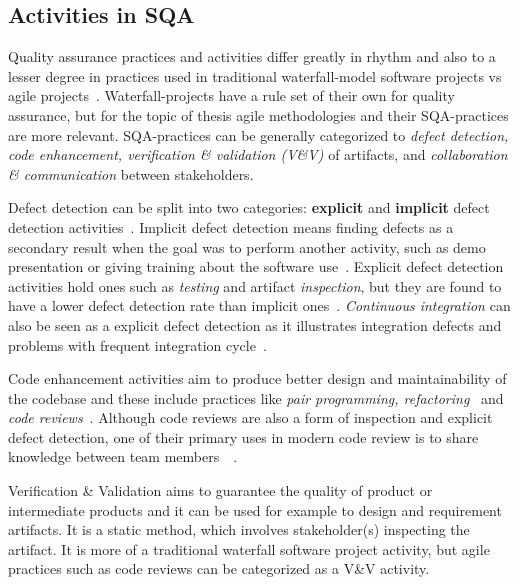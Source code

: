     \subsection{Activities in SQA}
    Quality assurance practices and activities differ greatly in rhythm and also to a lesser degree in practices used in
    traditional waterfall-model software projects vs agile projects~\cite{huo2004software}. Waterfall-projects have a rule set
    of their own for quality assurance, but for the topic of thesis agile methodologies and their SQA-practices are more relevant.
    SQA-practices can be generally categorized to \textit{defect detection, code enhancement, verification \& validation (V\&V)} of artifacts,
    and \textit{collaboration \& communication} between stakeholders.

    Defect detection can be split into two categories: \textbf{explicit} and \textbf{implicit} defect detection activities~\cite{mantyla2014software}.
    Implicit defect detection means finding defects as a secondary result when the goal was to perform another activity,
    such as demo presentation or giving training about the software use~\cite{mantyla2014software}. Explicit defect detection activities
    hold ones such as \textit{testing} and artifact \textit{inspection}, but they are found to have a lower
    defect detection rate than implicit ones~\cite{mantyla2014software}. \textit{Continuous integration} can also be seen
    as a explicit defect detection as it illustrates integration defects and problems with frequent integration cycle~\cite{huo2004software}.

    Code enhancement activities aim to produce better design and maintainability of the codebase and these include practices
    like \textit{pair programming, refactoring}~\cite{huo2004software} and \textit{code reviews}~\cite{rigby2013convergent}.
    Although code reviews are also a form of inspection and explicit defect detection, one of their primary uses in modern
    code review is to share knowledge between team members~\cite{mantyla2014software}~\cite{rigby2013convergent}.

    Verification \& Validation aims to guarantee the quality of product or intermediate products and it can be used for
    example to design and requirement artifacts. It is a static method, which involves stakeholder(s)
    inspecting the artifact. It is more of a traditional waterfall software project activity, but agile practices such as code reviews
    can be categorized as a V\&V activity. ~\cite{huo2004software}

